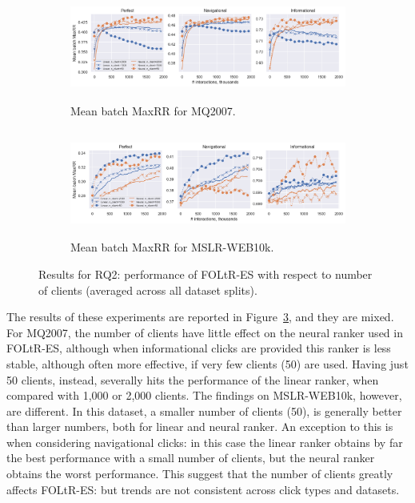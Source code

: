 \begin{figure}[t]
	\centering
	\begin{subfigure}{1\textwidth} \centering
		\includegraphics[width=13cm, height=3.5cm]{images/RQ2/mq2007_foltr_client_both_p0.9.png}
		\caption{Mean batch MaxRR for MQ2007.}
		\label{fig:mq2007-rq2}
	\end{subfigure}
	\begin{subfigure}{1\textwidth} \centering
		\includegraphics[width=13cm, height=3.5cm]{images/RQ2/mslr10k_foltr_client_both_p0.9.png}
		\caption{Mean batch MaxRR for MSLR-WEB10k.}
		\label{fig:mslr10k-rq2}
	\end{subfigure}
	\caption{Results for RQ2: performance of FOLtR-ES with respect to number of clients (averaged across all dataset splits). \label{fig:RQ2}} 
\end{figure}

The results of these experiments are reported in Figure~\ref{fig:RQ2}, and they are mixed. For MQ2007, the number of clients have little effect on the neural ranker used in FOLtR-ES, although when informational clicks are provided this ranker is less stable, although often more effective, if very few clients (50) are used. Having just 50 clients, instead, severally hits the performance of the linear ranker, when compared with 1,000 or 2,000 clients. The findings on MSLR-WEB10k, however, are different. In this dataset, a smaller number of clients (50), is generally better than larger numbers, both for linear and neural ranker. An exception to this is when considering navigational clicks: in this case the linear ranker obtains by far the best performance with a small number of clients, but the neural ranker obtains the worst performance. This suggest that the number of clients greatly affects FOLtR-ES: but trends are not consistent across click types and datasets. 

